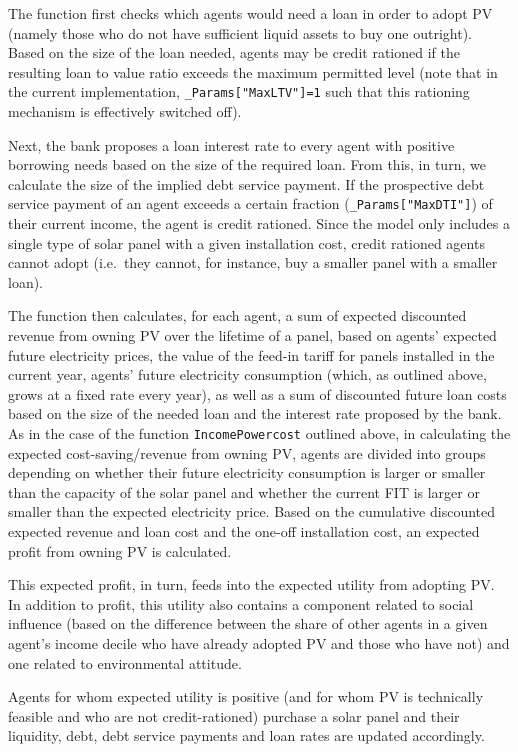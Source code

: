 \documentclass[
  letterpaper,
  DIV=11,
  numbers=noendperiod]{scrartcl}
\begin{document}
The function first checks which agents would need a loan in order to
adopt PV (namely those who do not have sufficient liquid assets to buy
one outright). Based on the size of the loan needed, agents may be
credit rationed if the resulting loan to value ratio exceeds the maximum
permitted level (note that in the current implementation,
\texttt{\_Params{[}"MaxLTV"{]}=1} such that this rationing mechanism is
effectively switched off).

Next, the bank proposes a loan interest rate to every agent with
positive borrowing needs based on the size of the required loan. From
this, in turn, we calculate the size of the implied debt service
payment. If the prospective debt service payment of an agent exceeds a
certain fraction (\texttt{\_Params{[}"MaxDTI"{]}}) of their current
income, the agent is credit rationed. Since the model only includes a
single type of solar panel with a given installation cost, credit
rationed agents cannot adopt (i.e.~they cannot, for instance, buy a
smaller panel with a smaller loan).

The function then calculates, for each agent, a sum of expected
discounted revenue from owning PV over the lifetime of a panel, based on
agents' expected future electricity prices, the value of the feed-in
tariff for panels installed in the current year, agents' future
electricity consumption (which, as outlined above, grows at a fixed rate
every year), as well as a sum of discounted future loan costs based on
the size of the needed loan and the interest rate proposed by the bank.
As in the case of the function \texttt{IncomePowercost} outlined above,
in calculating the expected cost-saving/revenue from owning PV, agents
are divided into groups depending on whether their future electricity
consumption is larger or smaller than the capacity of the solar panel
and whether the current FIT is larger or smaller than the expected
electricity price. Based on the cumulative discounted expected revenue
and loan cost and the one-off installation cost, an expected profit from
owning PV is calculated.

This expected profit, in turn, feeds into the expected utility from
adopting PV. In addition to profit, this utility also contains a
component related to social influence (based on the difference between
the share of other agents in a given agent's income decile who have
already adopted PV and those who have not) and one related to
environmental attitude.

Agents for whom expected utility is positive (and for whom PV is
technically feasible and who are not credit-rationed) purchase a solar
panel and their liquidity, debt, debt service payments and loan rates
are updated accordingly.
\end{document}

